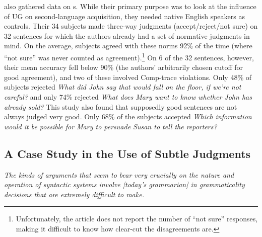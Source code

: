\citet{BleyVromanEtAl1988} also gathered data on s. While their primary purpose was to look at the
influence of UG on second-language acquisition, they needed native English speakers as controls. Their 34 subjects made three-way judgments (accept/reject/not sure) on 32 sentences for which the authors already had a set of normative judgments in mind. On the average, subjects agreed with these norms 92\% of the time (where ``not sure'' was never counted as agreement).\footnote{Unfortunately, the article does not report the number of ``not sure'' responses, making it difficult to know how clear-cut the disagreements are.}
 On 6 of the 32 sentences, however, their mean
accuracy fell below 90\% (the authors' arbitrarily chosen cutoff for good agreement), and two of these involved Comp-trace violations. Only 48\% of subjects rejected  \textit{What did John say that would fall  on the floor,  if we're not careful?} and
only 74\% rejected \textit{What does Mary want to know whether John has already sold?} This study also found that supposedly good sentences are not always judged very good. Only 68\% of the subjects accepted \textit{Which information would it be possible for Mary to persuade  Susan to tell the reporters?}

\subsection{A Case Study in the Use of Subtle Judgments}\label{sec:2.3.3}

\epigraph{\itshape The kinds of arguments that seem to bear very crucially on the nature and operation of syntactic systems involve [today's grammarian] in grammaticality decisions that are extremely difficult to make.\\[-2\baselineskip]}{\citep{Fillmore1972}}

